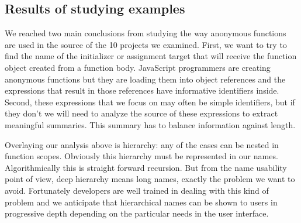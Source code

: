 \documentclass[10pt, preprint]{sigplanconf}
\begin{document}
\subsection{Results of studying examples}
We reached two main conclusions from studying the way anonymous functions are used in the source of the 10 projects we examined. First, we want to try to find the name of the initializer or assignment target that will receive the function object created from a function body.  JavaScript programmers are creating anonymous functions but they are loading them into object references and the expressions that result in those references have informative identifiers inside. Second, these expressions that we focus on may often be simple identifiers, but if they don't we will need to analyze the source of these expressions to extract meaningful summaries. This summary has to balance information against length.

Overlaying our analysis above is hierarchy: any of the cases can be nested in function scopes. Obviously this hierarchy must be represented in our names. Algorithmically this is straight forward recursion. But from the name usability point of view, deep hierarchy means long names, exactly the problem we want to avoid. Fortunately developers are well trained in dealing with this kind of problem and we anticipate  that hierarchical names can be shown to users in progressive depth depending on the particular needs in the user interface.


\end{document}
